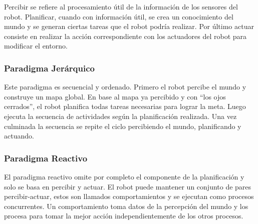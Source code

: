 Percibir se refiere al procesamiento útil de la información de los sensores del robot. Planificar, cuando con información útil, se crea un conocimiento del mundo y se generan ciertas tareas que el robot podría realizar. Por último actuar consiste en realizar la acción correspondiente con los actuadores del robot para modificar el entorno. 

\subsubsection{ Paradigma Jerárquico}

Este paradigma es secuencial y ordenado. Primero el robot percibe el mundo y construye un mapa global. En base al mapa ya percibido y con “los ojos cerrados”, el robot planifica todas tareas necesarias para lograr la meta. Luego ejecuta la secuencia de actividades según la planificación realizada. Una vez culminada la secuencia se repite el ciclo percibiendo el mundo, planificando y actuando. \cite{AiRobotics}

\subsubsection{Paradigma Reactivo}
El paradigma reactivo omite por completo el componente de la planificación y solo se basa en percibir y actuar. El robot puede mantener un conjunto de pares percibir-actuar, estos son llamados comportamientos y se ejecutan como procesos concurrentes. Un comportamiento toma datos de la percepción del mundo y los procesa para tomar la mejor acción independientemente de los otros procesos. \cite{AiRobotics}
